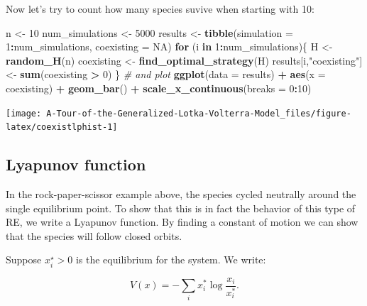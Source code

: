 \documentclass[]{book}
\newenvironment{Shaded}{\begin{snugshade}}{\end{snugshade}}
\newcommand{\CommentTok}[1]{\textcolor[rgb]{0.56,0.35,0.01}{\textit{#1}}}
\newcommand{\ControlFlowTok}[1]{\textcolor[rgb]{0.13,0.29,0.53}{\textbf{#1}}}
\newcommand{\DataTypeTok}[1]{\textcolor[rgb]{0.13,0.29,0.53}{#1}}
\newcommand{\DecValTok}[1]{\textcolor[rgb]{0.00,0.00,0.81}{#1}}
\newcommand{\KeywordTok}[1]{\textcolor[rgb]{0.13,0.29,0.53}{\textbf{#1}}}
\newcommand{\NormalTok}[1]{#1}
\newcommand{\OperatorTok}[1]{\textcolor[rgb]{0.81,0.36,0.00}{\textbf{#1}}}
\newcommand{\OtherTok}[1]{\textcolor[rgb]{0.56,0.35,0.01}{#1}}
\newcommand{\StringTok}[1]{\textcolor[rgb]{0.31,0.60,0.02}{#1}}
\begin{document}
Now let's try to count how many species suvive when starting with 10:

\begin{Shaded}
\begin{Highlighting}[]
\NormalTok{n <-}\StringTok{ }\DecValTok{10}
\NormalTok{num_simulations <-}\StringTok{ }\DecValTok{5000}
\NormalTok{results <-}\StringTok{ }\KeywordTok{tibble}\NormalTok{(}\DataTypeTok{simulation =} \DecValTok{1}\OperatorTok{:}\NormalTok{num_simulations, }\DataTypeTok{coexisting =} \OtherTok{NA}\NormalTok{)}
\ControlFlowTok{for}\NormalTok{ (i }\ControlFlowTok{in} \DecValTok{1}\OperatorTok{:}\NormalTok{num_simulations)\{}
\NormalTok{  H <-}\StringTok{ }\KeywordTok{random_H}\NormalTok{(n)}
\NormalTok{  coexisting <-}\StringTok{ }\KeywordTok{find_optimal_strategy}\NormalTok{(H)}
\NormalTok{  results[i,}\StringTok{"coexisting"}\NormalTok{] <-}\StringTok{ }\KeywordTok{sum}\NormalTok{(coexisting }\OperatorTok{>}\StringTok{ }\DecValTok{0}\NormalTok{)}
\NormalTok{\}}
\CommentTok{# and plot}
\KeywordTok{ggplot}\NormalTok{(}\DataTypeTok{data =}\NormalTok{ results) }\OperatorTok{+}\StringTok{ }\KeywordTok{aes}\NormalTok{(}\DataTypeTok{x =}\NormalTok{ coexisting) }\OperatorTok{+}\StringTok{ }\KeywordTok{geom_bar}\NormalTok{() }\OperatorTok{+}\StringTok{ }\KeywordTok{scale_x_continuous}\NormalTok{(}\DataTypeTok{breaks =} \DecValTok{0}\OperatorTok{:}\DecValTok{10}\NormalTok{)}
\end{Highlighting}
\end{Shaded}

\begin{center}\texttt{[image: A-Tour-of-the-Generalized-Lotka-Volterra-Model\_files/figure-latex/coexistlphist-1]} \end{center}

\hypertarget{lyapunov-function}{%
\subsection{Lyapunov function}\label{lyapunov-function}}

In the rock-paper-scissor example above, the species cycled neutrally around the single equilibrium point. To show that this is in fact the behavior of this type of RE, we write a Lyapunov function. By finding a constant of motion we can show that the species will follow closed orbits.

Suppose \(x_{i}^\star > 0\) is the equilibrium for the system. We write:

\[
V(x) = -\sum_i x_i^\ast \log \frac{x_i}{x_i^\ast} .
\]
\end{document}
